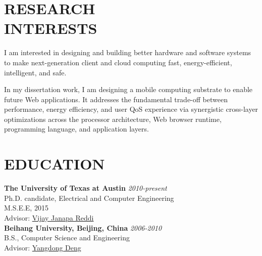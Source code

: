 \documentclass[margin, 9pt]{res} %
\begin{document}
\begin{resume}


\vspace*{-5pt}
\section{RESEARCH\\ INTERESTS} 

I am interested in designing and building better hardware and software systems
to make next-generation client and cloud computing fast, energy-efficient,
intelligent, and safe.

In my dissertation work, I am designing a mobile computing substrate to enable
future Web applications. It addresses the fundamental trade-off between
performance, energy efficiency, and user QoS experience via synergistic
cross-layer optimizations across the processor architecture, Web browser
runtime, programming language, and application layers.
 


\section{EDUCATION}

\textbf{The University of Texas at Austin} \hfill\textit{2010-present}\\
Ph.D. candidate, Electrical and Computer Engineering\\
M.S.E.E, 2015\\
Advisor: \href{http://3nity.io/~vj/}{Vijay Janapa Reddi}\\

\vspace*{-5pt}
\textbf{Beihang University, Beijing, China} \hfill\textit{2006-2010}\\
B.S., Computer Science and Engineering\\
Advisor: \href{https://research.nvidia.com/content/yangdong-steve-deng}{Yangdong Deng}


\end{resume}
\end{document}
